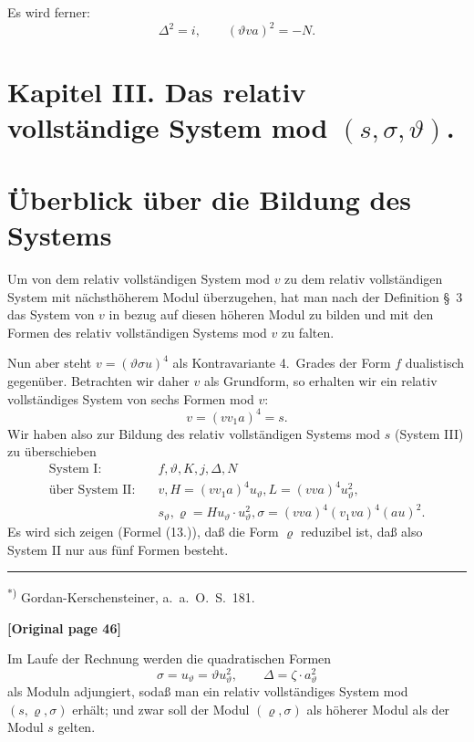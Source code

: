 \documentclass[12pt,a4paper]{article}
\begin{document}
Es wird ferner:
\begin{equation}\tag{6.}
\varDelta^2 = i, \qquad (\vartheta va)^2 = -N.
\end{equation}

\section*{Kapitel III. Das relativ vollständige System mod $(s, \sigma, \vartheta)$.}

\section{Überblick über die Bildung des Systems}

Um von dem relativ vollständigen System mod $v$ zu dem relativ vollständigen System mit nächsthöherem Modul überzugehen, hat man nach der Definition \S\ 3 das System von $v$ in bezug auf diesen höheren Modul zu bilden und mit den Formen des relativ vollständigen Systems mod $v$ zu falten.

Nun aber steht $v = (\vartheta \sigma u)^4$ als Kontravariante 4.\ Grades der Form $f$ dualistisch gegenüber. Betrachten wir daher $v$ als Grundform, so erhalten wir ein relativ vollständiges System von sechs Formen mod $v$:
\[v = (vv_1 a)^4 = s.\]
Wir haben also zur Bildung des relativ vollständigen Systems mod $s$ (System III) zu überschieben
\begin{align*}
\text{System I:} &\quad f, \vartheta, K, j, \varDelta, N\\
\text{über System II:} &\quad v, H = (vv_1 a)^4 u_\vartheta, L = (vva)^4 u_\vartheta^2,\\
&\quad s_\vartheta, \varrho = H u_\vartheta \cdot u_\vartheta^2, \sigma = (vva)^4 (v_1 va)^4 (au)^2.
\end{align*}
Es wird sich zeigen (Formel (13.)), daß die Form $\varrho$ reduzibel ist, daß also System II nur aus fünf Formen besteht.

\smallskip
\noindent\rule{\textwidth}{0.4pt}
\small
\textsuperscript{*)} Gordan-Kerschensteiner, a.\ a.\ O.\ S.\ 181.
\normalsize

\noindent\textbf{[Original page 46]}

Im Laufe der Rechnung werden die quadratischen Formen
\[\sigma = u_\vartheta = \vartheta u_\vartheta^2, \qquad \varDelta = \zeta \cdot a_\vartheta^2\]
als Moduln adjungiert, sodaß man ein relativ vollständiges System mod $(s, \varrho, \sigma)$ erhält; und zwar soll der Modul $(\varrho, \sigma)$ als höherer Modul als der Modul $s$ gelten.
\end{document}
